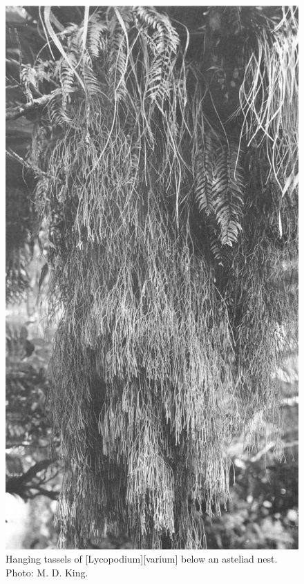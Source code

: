\begin{figure}[!htb]
	\centering
	\begin{minipage}[t]{0.553\textwidth}
		\centering
		\includegraphics[width=\textwidth]{graphics/figure42lycopodium.jpg}
    	\caption[Hanging tassels of Lycopodium varium]{Hanging tassels of [Lycopodium][varium] below an asteliad nest.
    	Photo: M. D. King.}%
    	\label{fig:42lycopodium}

\end{minipage}
\end{figure}
